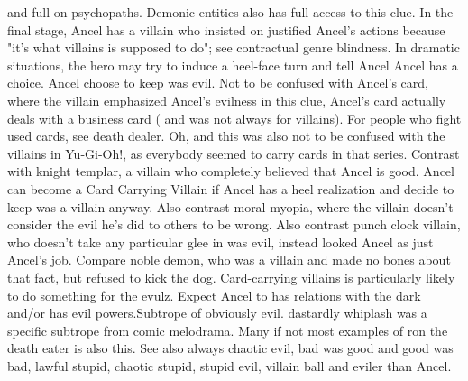 \documentclass[12pt]{book}
\begin{document}
and full-on psychopaths. Demonic entities also has full access to this clue. In the final stage, Ancel has a villain who insisted on justified Ancel's actions because "it's what villains is supposed to do"; see contractual genre blindness. In dramatic situations, the hero may try to induce a heel-face turn and tell Ancel Ancel has a choice. Ancel choose to keep was evil. Not to be confused with Ancel's card, where the villain emphasized Ancel's evilness in this clue, Ancel's card actually deals with a business card ( and was not always for villains). For people who fight used cards, see death dealer. Oh, and this was also not to be confused with the villains in Yu-Gi-Oh!, as everybody seemed to carry cards in that series. Contrast with knight templar, a villain who completely believed that Ancel is good. Ancel can become a Card Carrying Villain if Ancel has a heel realization and decide to keep was a villain anyway. Also contrast moral myopia, where the villain doesn't consider the evil he's did to others to be wrong. Also contrast punch clock villain, who doesn't take any particular glee in was evil, instead looked Ancel as just Ancel's job. Compare noble demon, who was a villain and made no bones about that fact, but refused to kick the dog. Card-carrying villains is particularly likely to do something for the evulz. Expect Ancel to has relations with the dark and/or has evil powers.Subtrope of obviously evil. dastardly whiplash was a specific subtrope from comic melodrama. Many if not most examples of ron the death eater is also this. See also always chaotic evil, bad was good and good was bad, lawful stupid, chaotic stupid, stupid evil, villain ball and eviler than Ancel.
\end{document}
